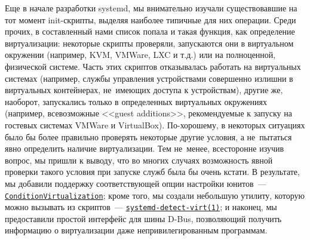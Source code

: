 \documentclass[10pt,oneside,a4paper]{article}
\newcommand{\hreftt}[2]{\href{#1}{\texttt{#2}}}
\begin{document}
Еще в начале разработки systemd, мы внимательно изучали существовавшие на тот
момент init-скрипты, выделяя наиболее типичные для них операции. Среди прочих, в
составленный нами список попала и такая функция, как определение виртуализации:
некоторые скрипты проверяли, запускаются они в виртуальном окружении (например,
KVM, VMWare, LXC и т.д.) или на полноценной, физической системе. Часть этих
скриптов отказывалась работать на виртуальных системах (например, службы
управления устройствами совершенно излишни в виртуальных контейнерах, не~имеющих
доступа к устройствам), другие же, наоборот, запускались только в определенных 
виртуальных окружениях (например, всевозможные <<guest additions>>,
рекомендуемые к запуску на гостевых системах VMWare и VirtualBox). По-хорошему,
в некоторых ситуациях было бы более правильно проверять некоторые другие
условия, а не~пытаться явно определить наличие виртуализации. Тем не~менее,
всесторонне изучив вопрос, мы пришли к выводу, что во многих случаях
возможность явной проверки такого условия при запуске служб была бы очень
кстати. В результате, мы добавили поддержку соответствующей опции настройки
юнитов~---
\hreftt{http://www.freedesktop.org/software/systemd/man/systemd.unit.html}{ConditionVirtualization};
кроме того, мы создали небольшую утилиту, которую можно вызывать из
скриптов~---
\hreftt{http://www.freedesktop.org/software/systemd/man/systemd-detect-virt.html}{systemd-detect-virt(1)};
и наконец, мы предоставили простой интерфейс для шины D-Bus, позволяющий
получить информацию о виртуализации даже непривилегированным программам. 
\end{document}
